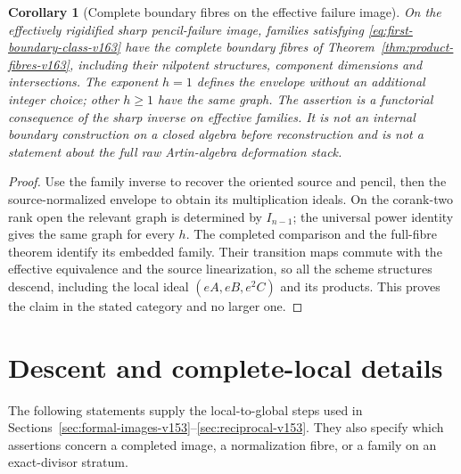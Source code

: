 \documentclass[11pt,reqno]{amsart}
\numberwithin{equation}{section}
\newtheorem{corollary}[theorem]{Corollary}
\theoremstyle{definition}\newtheorem{definition}[theorem]{Definition}
\theoremstyle{remark}\newtheorem{remark}[theorem]{Remark}
\begin{document}
\begin{corollary}[Complete boundary fibres on the effective failure image]
\label{cor:effective-full-fibres-v163}
On the effectively rigidified sharp pencil-failure image, families
satisfying \eqref{eq:first-boundary-class-v163} have the complete
boundary fibres of Theorem~\ref{thm:product-fibres-v163}, including
their nilpotent structures, component dimensions and intersections.
The exponent $h=1$ defines the envelope without an additional integer
choice; other $h\geq1$ have the same graph. The assertion is a
functorial consequence of the sharp inverse on effective families.
It is not an internal boundary construction on a closed algebra
before reconstruction and is not a statement about the full raw
Artin-algebra deformation stack.
\end{corollary}
\begin{proof}
Use the family inverse to recover the oriented source and pencil,
then the source-normalized envelope to obtain its multiplication
ideals. On the corank-two rank open the relevant graph is determined
by $I_{n-1}$; the universal power identity gives the same graph for
every $h$. The completed comparison and the full-fibre theorem
identify its embedded family. Their transition maps commute with
the effective equivalence and the source linearization, so all the
scheme structures descend, including the local ideal
$(eA,eB,e^2C)$ and its products. This proves the claim in the stated
category and no larger one.
\end{proof}

\section{Descent and complete-local details}
\label{sec:formal-details-v154}
The following statements supply the local-to-global steps used in
Sections~\ref{sec:formal-images-v153}--\ref{sec:reciprocal-v153}.
They also specify which assertions concern a completed image, a
normalization fibre, or a family on an exact-divisor stratum.
\end{document}
